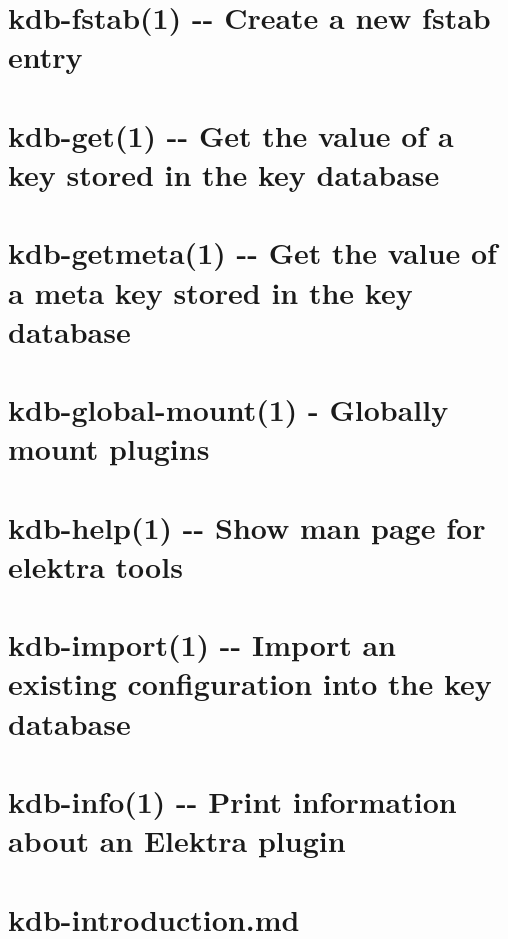 \documentclass[twoside]{book}
\newcommand{\+}{\discretionary{\mbox{\scriptsize$\hookleftarrow$}}{}{}}
\begin{document}
\chapter{kdb-\/fstab(1) -\/-\/ Create a new fstab entry}
\label{md_doc_help_kdb-fstab}
\hypertarget{md_doc_help_kdb-fstab}{}

\chapter{kdb-\/get(1) -\/-\/ Get the value of a key stored in the key database}
\label{md_doc_help_kdb-get}
\hypertarget{md_doc_help_kdb-get}{}

\chapter{kdb-\/getmeta(1) -\/-\/ Get the value of a meta key stored in the key database}
\label{md_doc_help_kdb-getmeta}
\hypertarget{md_doc_help_kdb-getmeta}{}

\chapter{kdb-\/global-\/mount(1) -\/ Globally mount plugins}
\label{md_doc_help_kdb-global-mount}
\hypertarget{md_doc_help_kdb-global-mount}{}

\chapter{kdb-\/help(1) -\/-\/ Show man page for elektra tools}
\label{md_doc_help_kdb-help}
\hypertarget{md_doc_help_kdb-help}{}

\chapter{kdb-\/import(1) -\/-\/ Import an existing configuration into the key database}
\label{md_doc_help_kdb-import}
\hypertarget{md_doc_help_kdb-import}{}

\chapter{kdb-\/info(1) -\/-\/ Print information about an Elektra plugin}
\label{md_doc_help_kdb-info}
\hypertarget{md_doc_help_kdb-info}{}

\chapter{kdb-\/introduction.md}
\label{doc_help_kdb-introduction_md}
\hypertarget{doc_help_kdb-introduction_md}{}

\end{document}
